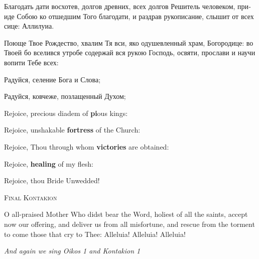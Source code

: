 \begin{russian}
  \Ierei Благодать дати восхотев, долгов древних, всех долгов Решитель человеком, прииде Собою ко отшедшим Того благодати, и раздрав рукописание, слышит от всех сице: Аллилуиа.


  Поюще Твое Рождество, хвалим Тя вси, яко одушевленный храм, Богородице: во Твоей бо вселився утробе содержай вся рукою Господь, освяти, прослави и научи вопити Тебе всех:

  Радуйся, селение Бога и Слова;


  Радуйся, ковчеже, позлащенный Духом;


\end{russian}

\pagebreak



Rejoice, precious diadem of \textbf{pi}ous kings:


Rejoice, unshakable \textbf{fortress} of the Church:


Rejoice, Thou through whom \textbf{victories} are obtained:


Rejoice, \textbf{healing} of my flesh:


Rejoice, thou Bride Unwedded!

\begin{center}
  {\textsc{\color{Maroon}Final Kontakion}}
\end{center}

\Priest O all-praised Mother Who didst bear the Word, holiest of all the saints, accept now our offering, and deliver us from all misfortune, and rescue from the torment to come those that cry to Thee: Alleluia! Alleluia! Alleluia! \Thrice

\begin{center}
  {\color{Maroon}\emph{And again we sing Oikos 1 and Kontakion 1 }}
\end{center}

